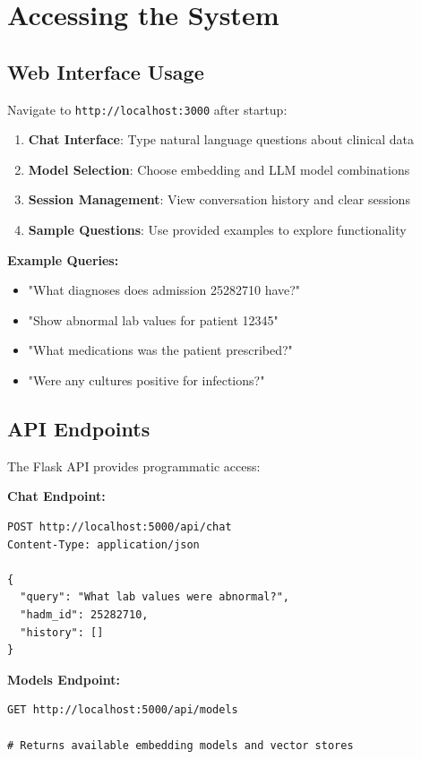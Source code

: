 \section{Accessing the System}

\subsection{Web Interface Usage}

Navigate to \texttt{http://localhost:3000} after startup:

\begin{enumerate}
    \item \textbf{Chat Interface}: Type natural language questions about clinical data
    \item \textbf{Model Selection}: Choose embedding and LLM model combinations
    \item \textbf{Session Management}: View conversation history and clear sessions
    \item \textbf{Sample Questions}: Use provided examples to explore functionality
\end{enumerate}

\textbf{Example Queries:}
\begin{itemize}
    \item "What diagnoses does admission 25282710 have?"
    \item "Show abnormal lab values for patient 12345"
    \item "What medications was the patient prescribed?"
    \item "Were any cultures positive for infections?"
\end{itemize}

\subsection{API Endpoints}

The Flask API provides programmatic access:

\textbf{Chat Endpoint:}
\begin{verbatim}
POST http://localhost:5000/api/chat
Content-Type: application/json

{
  "query": "What lab values were abnormal?",
  "hadm_id": 25282710,
  "history": []
}
\end{verbatim}

\textbf{Models Endpoint:}
\begin{verbatim}
GET http://localhost:5000/api/models

# Returns available embedding models and vector stores
\end{verbatim}

